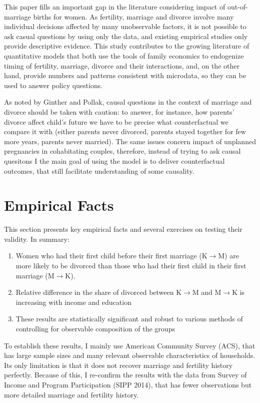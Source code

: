 \documentclass[12pt,letter]{article}
\begin{document}
This paper fills an important gap in the literature considering impact of out-of-marriage births for women. As fertility, marriage and divorce involve many individual decisions affected by many unobservable factors, it is not possible to ask casual questions by using only the data, and existing empirical studies only provide descriptive evidence. This study contributes to the growing literature of quantitative models that both use the tools of family economics to endogenize timing of fertility, marriage, divorce and their interactions, and, on the other hand, provide numbers and patterns consistent with microdata, so they can be used to answer policy questions.

As noted by Ginther and Pollak, causal questions in the context of marriage and divorce should be taken with caution: to answer, for instance, how parents' divorce affect child's future we have to be precise what counterfactual we compare it with (either parents never divorced, parents stayed together for few more years, parents never married). The same issues concern impact of unplanned pregnancies in cohabitating couples, therefore, instead of trying to ask causal quesitons I the main goal of using the model is to deliver counterfactual outcomes, that still facilitate understanding of some causality.

\section{Empirical Facts}

This section presents key empirical facts and several exercises on testing their validity. In summary:
\begin{enumerate}
\item Women who had their first child before their first marriage (K$\to$M) are more likely to be divorced than those who had their first child in their first marriage (M$\to$K).
\item Relative difference in the share of divorced between K$\to$M and M$\to$K is increasing with income and education
\item These results are statistically significant and robust to various methods of controlling for observable composition of the groups
\end{enumerate}

To establish these results, I mainly use American Community Survey (ACS), that has large sample sizes and many relevant observable characteristics of households. Its only limitation is that it does not recover marriage and fertility history perfectly. Because of this, I re-confirm the results with the data from Survey of Income and Program Participation (SIPP 2014), that has fewer observations but more detailed marriage and fertility history.
\end{document}
